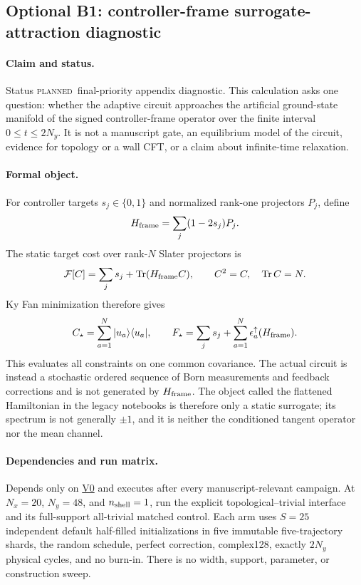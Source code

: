 \documentclass[aps,prx,twocolumn,floatfix,nofootinbib,superscriptaddress,longbibliography]{revtex4-2}
\newcommand{\qTr}{\operatorname{Tr}}
\newcommand{\planned}{\textsc{planned}}
\newcommand{\campref}[1]{\hyperref[camp:#1]{#1}}
\begin{document}
\subsection{Optional B1: controller-frame surrogate-attraction diagnostic}
\label{camp:B1}
\paragraph*{Claim and status.}
Status \planned\ final-priority appendix diagnostic.  This calculation asks one question:
whether the adaptive circuit approaches the artificial ground-state manifold of the
signed controller-frame operator over the finite interval $0\leq t\leq2N_y$.  It is not a
manuscript gate, an equilibrium model of the circuit, evidence for topology or a wall CFT,
or a claim about infinite-time relaxation.

\paragraph*{Formal object.}
For controller targets $s_j\in\{0,1\}$ and normalized rank-one projectors $P_j$, define
\begin{equation}
 H_{\rm frame}=\sum_j(1-2s_j)P_j .
 \label{eq:controller-frame-operator}
\end{equation}
The static target cost over rank-$N$ Slater projectors is
\begin{equation}
 \mathcal F[C]
 =\sum_js_j+\qTr(H_{\rm frame}C),\qquad C^2=C,\quad\qTr C=N.
 \label{eq:static-target-cost}
\end{equation}
Ky Fan minimization therefore gives
\begin{equation}
 C_\star=\sum_{a=1}^{N}|u_a\rangle\langle u_a|,\qquad
 F_\star=\sum_js_j+\sum_{a=1}^{N}\epsilon_a^\uparrow(H_{\rm frame}).
 \label{eq:static-frame-minimum}
\end{equation}
This evaluates all constraints on one common covariance.  The actual circuit is instead a
stochastic ordered sequence of Born measurements and feedback corrections and is not
generated by $H_{\rm frame}$.  The object called the flattened Hamiltonian in the legacy
notebooks is therefore only a static surrogate; its spectrum is not generally $\pm1$, and
it is neither the conditioned tangent operator nor the mean channel.

\paragraph*{Dependencies and run matrix.}
Depends only on \campref{V0} and executes after every manuscript-relevant campaign.  At
$N_x=20$, $N_y=48$, and $n_{\rm shell}=1$, run the explicit topological--trivial
interface and its full-support all-trivial matched control.  Each arm uses $S=25$
independent default half-filled initializations in five immutable five-trajectory shards,
the random schedule, perfect correction, complex128, exactly $2N_y$ physical cycles, and
no burn-in.  There is no width, support, parameter, or construction sweep.
\end{document}
